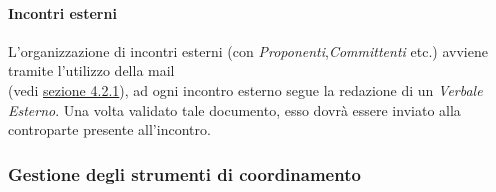 \paragraph{Incontri esterni}\label{Com esterne} L'organizzazione di incontri esterni (con \textit{Proponenti},\textit{Committenti} etc.) avviene tramite l'utilizzo della mail \\ \mailleaf (vedi \hyperref[Com esterne]{sezione 4.2.1}), ad ogni incontro esterno segue la redazione di un \textit{Verbale Esterno}. Una volta validato tale documento, esso dovrà essere inviato alla controparte presente all'incontro.

\subsubsection{Gestione degli strumenti di coordinamento}